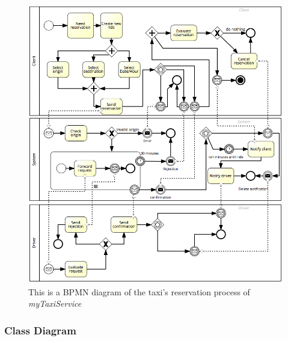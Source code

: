 \documentclass[a4paper]{article}
\begin{document}
\begin{figure}[H]
\includegraphics[width=\sequenceWidth]{BPMN-rideReservation}
\centering
\caption[BPMN Ride Reservation]{This is a BPMN diagram of the taxi's reservation process of \emph{myTaxiService}}
\label{fig:bpmndiagramreservation}
\end{figure}


\subsubsection{Class Diagram}
\end{document}
